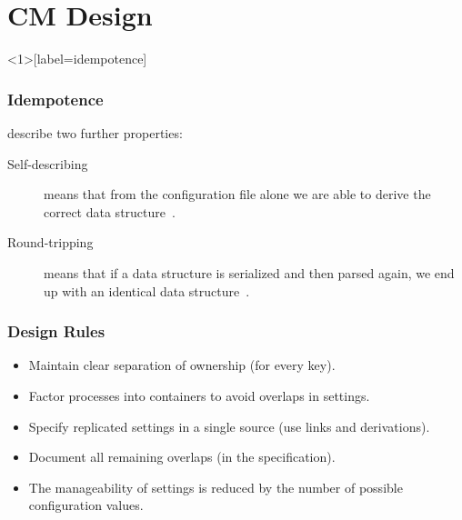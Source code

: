 \section{CM Design}

\begin{frame}<1>[label=idempotence]
	\frametitle{Idempotence}


\end{frame}

\begin{frame}
	\citet{wadler2003xml} describe two further properties:
	\vspace{2em}

	\begin{description}
	\item[Self-describing]
	means that from the configuration file alone we are able to derive the correct data structure~\cite{wadler2003xml}.

	\item[Round-tripping]
	means that if a data structure is serialized and then parsed again, we end up with an identical data structure~\cite{wadler2003xml}.
	\end{description}
\end{frame}

\begin{frame}
	\frametitle{Design Rules~\cite{burgess2006modeling}}

	\begin{itemize}[<+-| alert@+>]
	\item Maintain clear separation of ownership (for every key).
	\item Factor processes into containers to avoid overlaps in settings.
	\item Specify replicated settings in a single source (use links and derivations).
	\item Document all remaining overlaps (in the specification).
	\item The manageability of settings is reduced by the number of possible configuration values.
	\end{itemize}
\end{frame}

